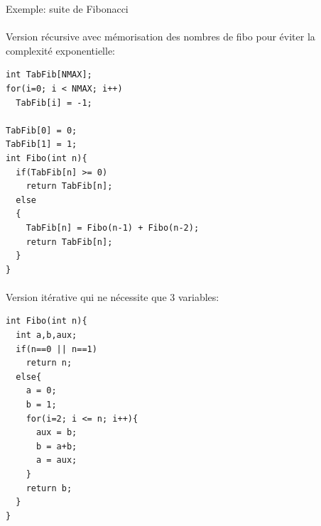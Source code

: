 \begin{exercice}{Exemple: suite de Fibonacci}
\paragraph{}
Version récursive avec mémorisation des nombres de fibo pour éviter la complexité exponentielle:

\begin{verbatim}
int TabFib[NMAX];
for(i=0; i < NMAX; i++)
  TabFib[i] = -1;

TabFib[0] = 0;
TabFib[1] = 1;
int Fibo(int n){
  if(TabFib[n] >= 0)
    return TabFib[n];
  else
  {
    TabFib[n] = Fibo(n-1) + Fibo(n-2);
    return TabFib[n];
  }
}
\end{verbatim}

\paragraph{}
Version itérative qui ne nécessite que 3 variables:

\begin{verbatim}
int Fibo(int n){
  int a,b,aux;
  if(n==0 || n==1)
    return n;
  else{
    a = 0;
    b = 1;
    for(i=2; i <= n; i++){
      aux = b;
      b = a+b;
      a = aux;
    }
    return b;
  }
}
\end{verbatim}

\end{exercice}


